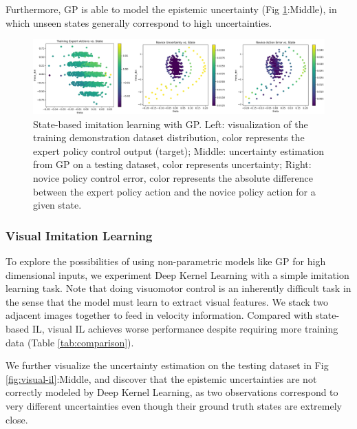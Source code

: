 \documentclass[11pt, reqno, letterpaper, twoside]{amsart}
\begin{document}
Furthermore, GP is able to model the epistemic uncertainty (Fig \ref{fig:state-il}:Middle), in which unseen states generally correspond to high uncertainties.

\begin{figure}[ht]
	\centering
	\includegraphics[width=\linewidth]{imgs/state-il.png}
	\caption{State-based imitation learning with GP. Left: visualization of the training demonstration dataset distribution, color represents the expert policy control output (target); Middle: uncertainty estimation from GP on a testing dataset, color represents uncertainty; Right: novice policy control error, color represents the absolute difference between the expert policy action and the novice policy action for a given state.}
	\label{fig:state-il}
\end{figure}

\subsubsection{Visual Imitation Learning} \label{vis-il}
To explore the possibilities of using non-parametric models like GP for high dimensional inputs, we experiment Deep Kernel Learning with a simple imitation learning task. Note that doing visuomotor control is an inherently difficult task in the sense that the model must learn to extract visual features.
We stack two adjacent images together to feed in velocity information.
Compared with state-based IL, visual IL  achieves worse performance despite requiring more training data (Table \ref{tab:comparison}).

We further visualize the uncertainty estimation on the testing dataset in Fig \ref{fig:visual-il}:Middle, and discover that the epistemic uncertainties are not correctly modeled by Deep Kernel Learning, as two observations correspond to very different uncertainties even though their ground truth states are extremely close.
\end{document}
